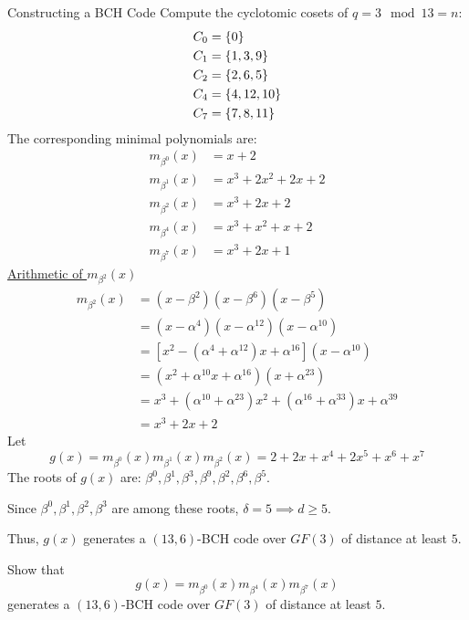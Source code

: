 \begin{Example}{Constructing a BCH Code}{}
    Compute the cyclotomic cosets of $ q=3\mod 13=n $:
    \begin{align*}
        C_0 & =\{0\}       \\
        C_1 & =\{1,3,9\}   \\
        C_2 & =\{2,6,5\}   \\
        C_4 & =\{4,12,10\} \\
        C_7 & =\{7,8,11\}
    \end{align*}
    The corresponding minimal polynomials are:
    \begin{align*}
        m_{\beta^0}(x) & =x+2           \\
        m_{\beta^1}(x) & =x^3+2x^2+2x+2 \\
        m_{\beta^2}(x) & =x^3+2x+2      \\
        m_{\beta^4}(x) & =x^3+x^2+x+2   \\
        m_{\beta^7}(x) & =x^3+2x+1
    \end{align*}
    \underline{Arithmetic of $ m_{\beta^2}(x) $}
    \begin{align*}
        m_{\beta^2}(x)
         & =(x-\beta^2)(x-\beta^6)(x-\beta^5)                                     \\
         & =(x-\alpha^4)(x-\alpha^{12})(x-\alpha^{10})                            \\
         & =\left[ x^2-(\alpha^4+\alpha^{12})x+\alpha^{16} \right](x-\alpha^{10}) \\
         & =(x^2+\alpha^{10}x+\alpha^{16})(x+\alpha^{23})                         \\
         & =x^3+(\alpha^{10}+\alpha^{23})x^2+(\alpha^{16}+\alpha^{33})x+
        \alpha^{39}                                                               \\
         & =x^3+2x+2
    \end{align*}
    Let
    \[ g(x)=m_{\beta^0}(x)m_{\beta^1}(x)m_{\beta^2}(x)=2+2x+x^4+2x^5+x^6+x^7 \]
    The roots of $ g(x) $ are:
    $ \beta^0,\beta^1,\beta^3,\beta^9,\beta^2,\beta^6,\beta^5 $.

    Since $ \beta^0,\beta^1,\beta^2,\beta^3 $ are among these roots,
    $ \delta=5\implies d\geqslant 5 $.

    Thus, $ g(x) $ generates a $ (13,6) $-BCH code over $ GF(3) $
    of distance at least $ 5 $.
\end{Example}

\begin{Exercise}{}{}
    Show that
    \[ g(x)=m_{\beta^0}(x)m_{\beta^4}(x)m_{\beta^7}(x) \]
    generates a $ (13,6) $-BCH code over $ GF(3) $ of distance at least $ 5 $.
\end{Exercise}

